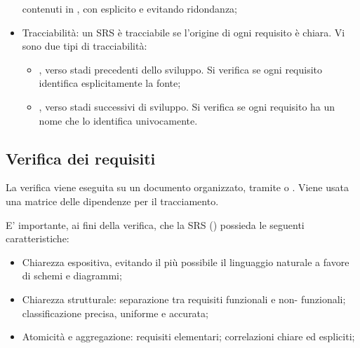 \begin{itemize}
        contenuti in , con  esplicito e evitando ridondanza;
  \item Tracciabilità: un SRS è tracciabile se l'origine di ogni requisito è
        chiara. Vi sono due tipi di tracciabilità:
        \begin{itemize}
          \item {}, verso stadi precedenti
                dello sviluppo. Si verifica se ogni requisito identifica
                esplicitamente la fonte;
          \item {}, verso stadi successivi di
                sviluppo. Si verifica se ogni requisito ha un nome che lo
                identifica univocamente.
        \end{itemize}
\end{itemize}

\subsection{Verifica dei requisiti}
La verifica viene eseguita su un documento organizzato, tramite
 o . Viene usata una matrice
delle dipendenze per il tracciamento.

E' importante, ai fini della verifica, che la SRS () possieda le seguenti caratteristiche:
\begin{itemize}
  \item Chiarezza espositiva, evitando il più possibile il linguaggio naturale a
        favore di schemi e diagrammi;
  \item Chiarezza strutturale: separazione tra requisiti funzionali e non-
        funzionali; classificazione precisa, uniforme e accurata;
  \item Atomicità e aggregazione: requisiti elementari; correlazioni chiare ed
        espliciti;
\end{itemize}
